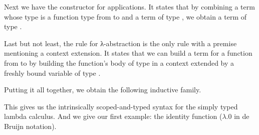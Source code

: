 \noindent
\begin{minipage}[t]{.25\textwidth}
\end{minipage}\hfill
\begin{minipage}[t]{.17\textwidth}
\begin{mathpar}
\end{mathpar}
\end{minipage}

Next we have the constructor for applications. It states that
by combining a term whose type is a function type from  to 
and a term of type , we obtain a term of type .

\noindent
\begin{minipage}[t]{.25\textwidth}
\end{minipage}\hfill
\begin{minipage}[t]{.17\textwidth}
\begin{mathpar}
\end{mathpar}
\end{minipage}

Last but not least, the rule for λ-abstraction is the only rule
with a premise mentioning a context extension. It states that
we can build a term for a function from  to  by
building the function's body of type  in a context extended
by a freshly bound variable of type .

\noindent
\begin{minipage}[t]{.25\textwidth}
\end{minipage}\hfill
\begin{minipage}[t]{.17\textwidth}
\begin{mathpar}
\end{mathpar}
\end{minipage}

Putting it all together, we obtain the following inductive family.

\begin{AgdaAlign}
\begin{AgdaSuppressSpace}
\end{AgdaSuppressSpace}
\end{AgdaAlign}

This gives us the intrinsically scoped-and-typed syntax for
the simply typed lambda calculus.
And we give our first example: the identity function ($λ.0$ in de Bruijn notation).

